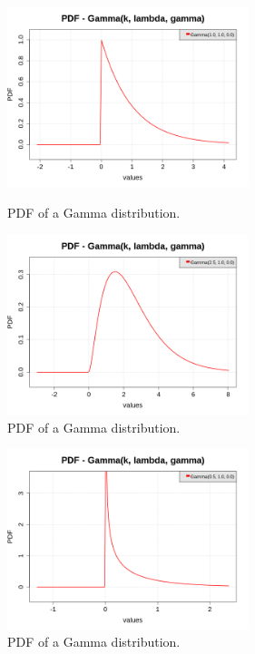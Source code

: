 {\begin{itemize}
\begin{figure}[H]
\begin{minipage}{8cm}
\begin{center}
\includegraphics[width=7cm]{Figures/pdf_Gamma_1.png}
\caption{PDF of a Gamma distribution.}
\end{center}
\end{minipage}
\hfill
\begin{minipage}{8cm}
\begin{center}
\includegraphics[width=7cm]{Figures/pdf_Gamma_2.png}
\caption{PDF of a Gamma distribution.}
\end{center}
\end{minipage}
\end{figure}

\begin{figure}[H]
\begin{center}
\includegraphics[width=7cm]{Figures/pdf_Gamma_3.png}
\caption{PDF of a Gamma distribution.}
\end{center}
\end{figure}




\end{itemize}}

